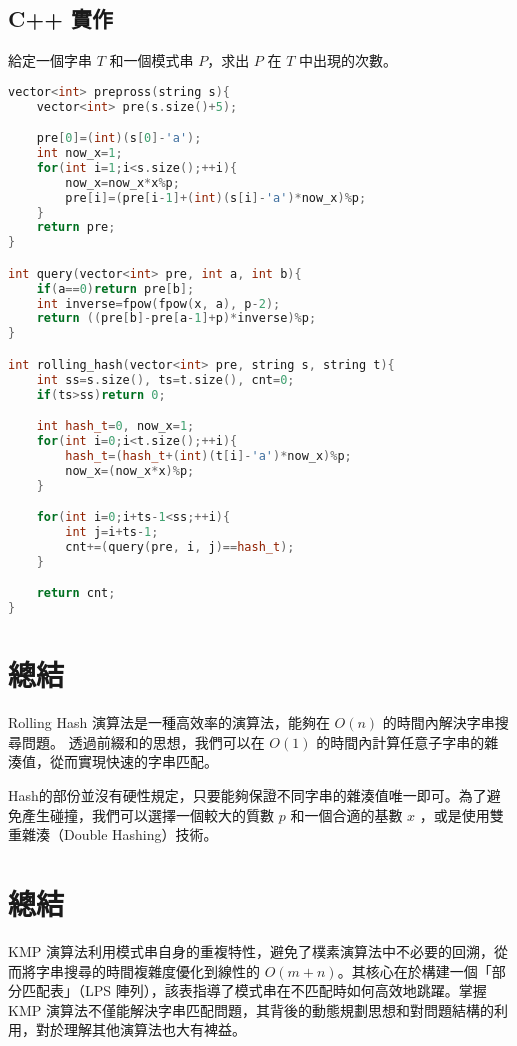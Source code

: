 \documentclass[12pt,a4paper]{article}
\begin{document}
\subsection{C++ 實作}

給定一個字串 $T$ 和一個模式串 $P$，求出 $P$ 在 $T$ 中出現的次數。

\begin{lstlisting}[language=C++]
vector<int> prepross(string s){
    vector<int> pre(s.size()+5);

    pre[0]=(int)(s[0]-'a');
    int now_x=1;
    for(int i=1;i<s.size();++i){
        now_x=now_x*x%p;
        pre[i]=(pre[i-1]+(int)(s[i]-'a')*now_x)%p;
    }
    return pre;
}

int query(vector<int> pre, int a, int b){
    if(a==0)return pre[b];
    int inverse=fpow(fpow(x, a), p-2);
    return ((pre[b]-pre[a-1]+p)*inverse)%p;
}

int rolling_hash(vector<int> pre, string s, string t){
    int ss=s.size(), ts=t.size(), cnt=0;
    if(ts>ss)return 0;

    int hash_t=0, now_x=1;
    for(int i=0;i<t.size();++i){
        hash_t=(hash_t+(int)(t[i]-'a')*now_x)%p;
        now_x=(now_x*x)%p;
    }

    for(int i=0;i+ts-1<ss;++i){
        int j=i+ts-1;
        cnt+=(query(pre, i, j)==hash_t);
    }

    return cnt;
}
\end{lstlisting}

\section{總結}
Rolling Hash 演算法是一種高效率的演算法，能夠在 $O(n)$ 的時間內解決字串搜尋問題。
透過前綴和的思想，我們可以在 $O(1)$ 的時間內計算任意子字串的雜湊值，從而實現快速的字串匹配。

Hash的部份並沒有硬性規定，只要能夠保證不同字串的雜湊值唯一即可。為了避免產生碰撞，我們可以選擇一個較大的質數 $p$ 和一個合適的基數 $x$
，或是使用雙重雜湊（Double Hashing）技術。


\section{總結}
KMP 演算法利用模式串自身的重複特性，避免了樸素演算法中不必要的回溯，從而將字串搜尋的時間複雜度優化到線性的 $O(m+n)$。其核心在於構建一個「部分匹配表」（LPS 陣列），該表指導了模式串在不匹配時如何高效地跳躍。掌握 KMP 演算法不僅能解決字串匹配問題，其背後的動態規劃思想和對問題結構的利用，對於理解其他演算法也大有裨益。
\end{document}
